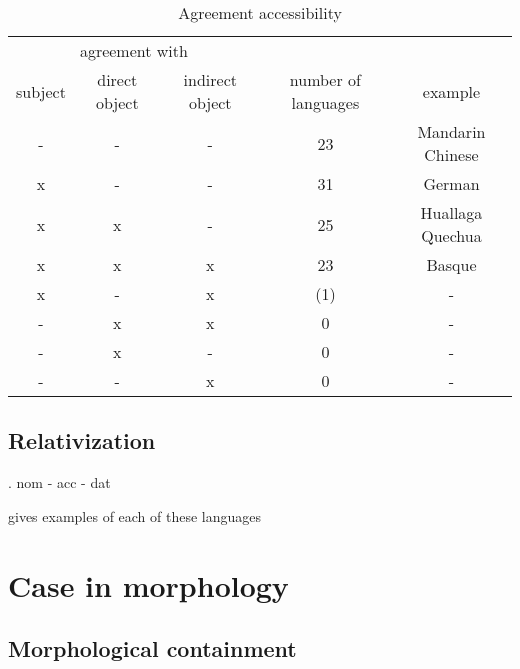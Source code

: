 \begin{table}[H]
  \center
  \caption {Agreement accessibility}
    \begin{tabular}{ccccc}
      \toprule
            \multicolumn{3}{c}{agreement with}
            &
          & \\
      \cmidrule{1-3}
            subject
            & direct object
            & indirect object
            & number of languages
          & example \\
      \cmidrule{1-3} \cmidrule{4-4} \cmidrule{5-5}
            -
            & -
            & -
            & 23
          & Mandarin Chinese \\
            x
            & -
            & -
            & 31
          & German \\
            x
            & x
            & -
            & 25
          & Huallaga Quechua \\
            x
            & x
            & x
            & 23
          & Basque \\
            x
            & -
            & x
            & (1)
          & - \\
            -
            & x
            & x
            & 0
          & - \\
            -
            & x
            & -
            & 0
          & - \\
            -
            & -
            & x
            & 0
          & - \\
      \bottomrule
    \end{tabular}
\end{table}



\subsection{Relativization}





\ex. \ac{nom} - \ac{acc} - \ac{dat}

gives examples of each of these languages




\section{Case in morphology}

\subsection{Morphological containment}

